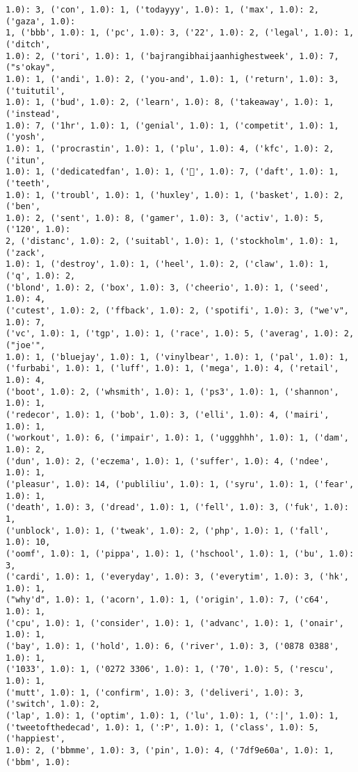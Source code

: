 \documentclass[11pt]{article}
\begin{document}
\begin{Verbatim}[commandchars=\\\{\}]
1.0): 3, ('con', 1.0): 1, ('todayyy', 1.0): 1, ('max', 1.0): 2, ('gaza', 1.0):
1, ('bbb', 1.0): 1, ('pc', 1.0): 3, ('22', 1.0): 2, ('legal', 1.0): 1, ('ditch',
1.0): 2, ('tori', 1.0): 1, ('bajrangibhaijaanhighestweek', 1.0): 7, ("s'okay",
1.0): 1, ('andi', 1.0): 2, ('you-and', 1.0): 1, ('return', 1.0): 3, ('tuitutil',
1.0): 1, ('bud', 1.0): 2, ('learn', 1.0): 8, ('takeaway', 1.0): 1, ('instead',
1.0): 7, ('1hr', 1.0): 1, ('genial', 1.0): 1, ('competit', 1.0): 1, ('yosh',
1.0): 1, ('procrastin', 1.0): 1, ('plu', 1.0): 4, ('kfc', 1.0): 2, ('itun',
1.0): 1, ('dedicatedfan', 1.0): 1, ('💜', 1.0): 7, ('daft', 1.0): 1, ('teeth',
1.0): 1, ('troubl', 1.0): 1, ('huxley', 1.0): 1, ('basket', 1.0): 2, ('ben',
1.0): 2, ('sent', 1.0): 8, ('gamer', 1.0): 3, ('activ', 1.0): 5, ('120', 1.0):
2, ('distanc', 1.0): 2, ('suitabl', 1.0): 1, ('stockholm', 1.0): 1, ('zack',
1.0): 1, ('destroy', 1.0): 1, ('heel', 1.0): 2, ('claw', 1.0): 1, ('q', 1.0): 2,
('blond', 1.0): 2, ('box', 1.0): 3, ('cheerio', 1.0): 1, ('seed', 1.0): 4,
('cutest', 1.0): 2, ('ffback', 1.0): 2, ('spotifi', 1.0): 3, ("we'v", 1.0): 7,
('vc', 1.0): 1, ('tgp', 1.0): 1, ('race', 1.0): 5, ('averag', 1.0): 2, ("joe'",
1.0): 1, ('bluejay', 1.0): 1, ('vinylbear', 1.0): 1, ('pal', 1.0): 1,
('furbabi', 1.0): 1, ('luff', 1.0): 1, ('mega', 1.0): 4, ('retail', 1.0): 4,
('boot', 1.0): 2, ('whsmith', 1.0): 1, ('ps3', 1.0): 1, ('shannon', 1.0): 1,
('redecor', 1.0): 1, ('bob', 1.0): 3, ('elli', 1.0): 4, ('mairi', 1.0): 1,
('workout', 1.0): 6, ('impair', 1.0): 1, ('uggghhh', 1.0): 1, ('dam', 1.0): 2,
('dun', 1.0): 2, ('eczema', 1.0): 1, ('suffer', 1.0): 4, ('ndee', 1.0): 1,
('pleasur', 1.0): 14, ('publiliu', 1.0): 1, ('syru', 1.0): 1, ('fear', 1.0): 1,
('death', 1.0): 3, ('dread', 1.0): 1, ('fell', 1.0): 3, ('fuk', 1.0): 1,
('unblock', 1.0): 1, ('tweak', 1.0): 2, ('php', 1.0): 1, ('fall', 1.0): 10,
('oomf', 1.0): 1, ('pippa', 1.0): 1, ('hschool', 1.0): 1, ('bu', 1.0): 3,
('cardi', 1.0): 1, ('everyday', 1.0): 3, ('everytim', 1.0): 3, ('hk', 1.0): 1,
("why'd", 1.0): 1, ('acorn', 1.0): 1, ('origin', 1.0): 7, ('c64', 1.0): 1,
('cpu', 1.0): 1, ('consider', 1.0): 1, ('advanc', 1.0): 1, ('onair', 1.0): 1,
('bay', 1.0): 1, ('hold', 1.0): 6, ('river', 1.0): 3, ('0878 0388', 1.0): 1,
('1033', 1.0): 1, ('0272 3306', 1.0): 1, ('70', 1.0): 5, ('rescu', 1.0): 1,
('mutt', 1.0): 1, ('confirm', 1.0): 3, ('deliveri', 1.0): 3, ('switch', 1.0): 2,
('lap', 1.0): 1, ('optim', 1.0): 1, ('lu', 1.0): 1, (':|', 1.0): 1,
('tweetofthedecad', 1.0): 1, (':P', 1.0): 1, ('class', 1.0): 5, ('happiest',
1.0): 2, ('bbmme', 1.0): 3, ('pin', 1.0): 4, ('7df9e60a', 1.0): 1, ('bbm', 1.0):

\end{Verbatim}
\end{document}
